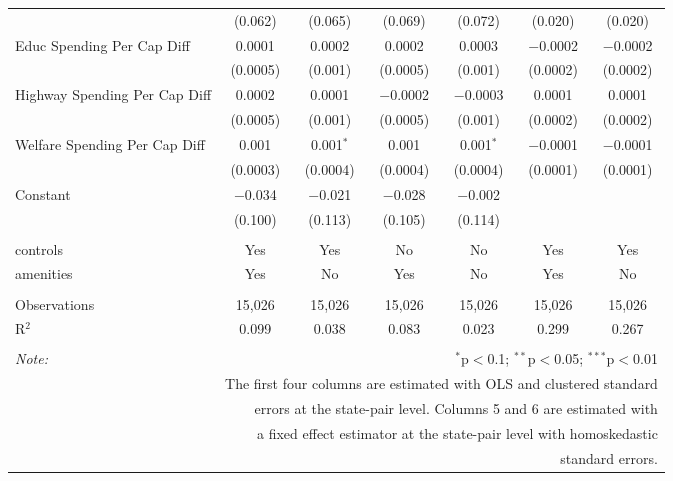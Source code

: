 \begin{table}[!htbp]
\begin{tabular}{@{\extracolsep{5pt}}lcccccc}
  & (0.062) & (0.065) & (0.069) & (0.072) & (0.020) & (0.020) \\ 
  Educ Spending Per Cap Diff & 0.0001 & 0.0002 & 0.0002 & 0.0003 & $-$0.0002 & $-$0.0002 \\ 
  & (0.0005) & (0.001) & (0.0005) & (0.001) & (0.0002) & (0.0002) \\ 
  Highway Spending Per Cap Diff & 0.0002 & 0.0001 & $-$0.0002 & $-$0.0003 & 0.0001 & 0.0001 \\ 
  & (0.0005) & (0.001) & (0.0005) & (0.001) & (0.0002) & (0.0002) \\ 
  Welfare Spending Per Cap Diff & 0.001 & 0.001$^{*}$ & 0.001 & 0.001$^{*}$ & $-$0.0001 & $-$0.0001 \\ 
  & (0.0003) & (0.0004) & (0.0004) & (0.0004) & (0.0001) & (0.0001) \\ 
  Constant & $-$0.034 & $-$0.021 & $-$0.028 & $-$0.002 &  &  \\ 
  & (0.100) & (0.113) & (0.105) & (0.114) &  &  \\ 
 \hline \\[-1.8ex] 
controls & Yes & Yes & No & No & Yes & Yes \\ 
amenities & Yes & No & Yes & No & Yes & No \\ 
\hline \\[-1.8ex] 
Observations & 15,026 & 15,026 & 15,026 & 15,026 & 15,026 & 15,026 \\ 
R$^{2}$ & 0.099 & 0.038 & 0.083 & 0.023 & 0.299 & 0.267 \\ 
\hline 
\hline \\[-1.8ex] 
\textit{Note:}  & \multicolumn{6}{r}{$^{*}$p$<$0.1; $^{**}$p$<$0.05; $^{***}$p$<$0.01} \\ 
 & \multicolumn{6}{r}{The first four columns are estimated with OLS and clustered standard} \\ 
 & \multicolumn{6}{r}{ errors at the state-pair level. Columns 5 and 6 are estimated with} \\ 
 & \multicolumn{6}{r}{a fixed effect estimator at the state-pair level with homoskedastic} \\ 
 & \multicolumn{6}{r}{standard errors.} \\ 
\end{tabular} 
\end{table} 
